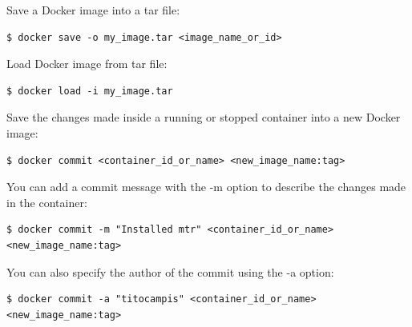 \documentclass{article}
\newenvironment{blocktemplateI}[1]{%
    \tcolorbox[beamer,%
    noparskip,breakable,
    colframe=Violet,%
    colbacklower=Black,%
    title=#1]}%
    {\endtcolorbox}
\newenvironment{codetemplate}[1][]{%
  \mybasecolorbox[#1]
  \itshape
}{%
  \endmybasecolorbox
}
\begin{document}
Save a Docker image into a tar file:
\begin{codetemplate}{}
\begin{verbatim}
$ docker save -o my_image.tar <image_name_or_id>
\end{verbatim}
\end{codetemplate}

Load Docker image from tar file:
\begin{codetemplate}{}
\begin{verbatim}
$ docker load -i my_image.tar
\end{verbatim}
\end{codetemplate}

Save the changes made inside a running or stopped container into a new Docker image:
\begin{codetemplate}{}
\begin{verbatim}
$ docker commit <container_id_or_name> <new_image_name:tag>
\end{verbatim}
\end{codetemplate}

\begin{blocktemplateI}{NOTE}
You can add a commit message with the -m option to describe the changes made in the container:
\begin{codetemplate}{}
\begin{verbatim}
$ docker commit -m "Installed mtr" <container_id_or_name> <new_image_name:tag>
\end{verbatim}
\end{codetemplate}
You can also specify the author of the commit using the -a option:
\begin{codetemplate}{}
\begin{verbatim}
$ docker commit -a "titocampis" <container_id_or_name> <new_image_name:tag>
\end{verbatim}
\end{codetemplate}
\end{blocktemplateI}
\end{document}
